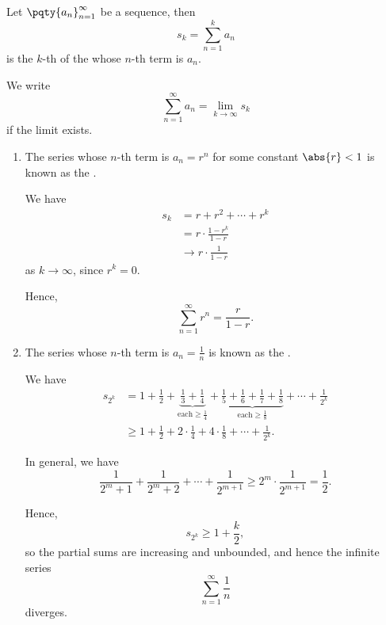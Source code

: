 \begin{definition}
    Let \(\pqty{a_n}_{n = 1}^{\infty}\) be a sequence, then
    \[
        s_k = \sum_{n = 1}^{k} a_n
    \]
    is the \(k\)-th  of the  whose \(n\)-th term is \(a_n\).

    We write
    \[
        \sum_{n = 1}^{\infty} a_n = \lim_{k \to \infty} s_k
    \]
    if the limit exists.
\end{definition}

\begin{examples}
    \begin{enumerate}
        \item The series whose \(n\)-th term is \(a_n = r^n\) for some constant \(\abs{r} < 1\) is known as the .
        
        We have
        \begin{align*}
            s_k &= r + r^2 + \cdots + r^k \\
            &= r \cdot \frac{1 - r^k}{1 - r} \\
            & \to r \cdot \frac{1}{1 - r}
        \end{align*}
        as \(k \to \infty\), since \(r^k = 0\).

        Hence,
        \[
            \sum_{n = 1}^{\infty} r^n = \frac{r}{1 - r}.
        \]

        \item The series whose \(n\)-th term is \(a_n = \frac{1}{n}\) is known as the .
        
        We have
        \begin{align*}
            s_{2^k} &= 1 + \frac{1}{2} + \underbrace{\frac{1}{3} + \frac{1}{4}}_{\text{each} \geq \frac{1}{4}} + \underbrace{\frac{1}{5} + \frac{1}{6} + \frac{1}{7} + \frac{1}{8}}_{\text{each} \geq \frac{1}{8}} + \cdots + \frac{1}{2^k} \\
            &\geq 1 + \frac{1}{2} + 2 \cdot \frac{1}{4} + 4 \cdot \frac{1}{8} + \cdots + \frac{1}{2^k}.
        \end{align*}

        In general, we have
        \[
            \frac{1}{2^m + 1} + \frac{1}{2^m + 2} + \cdots + \frac{1}{2^{m + 1}} \geq 2^m \cdot \frac{1}{2^{m + 1}} = \frac{1}{2}.
        \]

        Hence,
        \[
            s_{2^k} \geq 1 + \frac{k}{2},
        \]
        so the partial sums are increasing and unbounded, and hence the infinite series
        \[
            \sum_{n = 1}^{\infty} \frac{1}{n}
        \]
        diverges.


\end{enumerate}
\end{examples}
